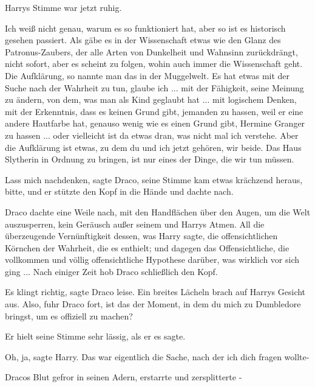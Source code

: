 Harrys Stimme war jetzt ruhig.

\glqq{}Ich weiß nicht genau, warum es so funktioniert hat, aber so ist es
historisch gesehen passiert. Als gäbe es in der Wissenschaft etwas wie den Glanz
des Patronus-Zaubers, der alle Arten von Dunkelheit und Wahnsinn zurückdrängt,
nicht sofort, aber es scheint zu folgen, wohin auch immer die Wissenschaft geht.
Die Aufklärung, so nannte man das in der Muggelwelt. Es hat etwas mit der Suche
nach der Wahrheit zu tun, glaube ich ... mit der Fähigkeit, seine Meinung zu
ändern, von dem, was man als Kind geglaubt hat ... mit logischem Denken, mit der
Erkenntnis, dass es keinen Grund gibt, jemanden zu hassen, weil er eine andere
Hautfarbe hat, genauso wenig wie es einen Grund gibt, Hermine Granger zu
hassen ... oder vielleicht ist da etwas dran, was nicht mal ich verstehe. Aber
die Aufklärung ist etwas, zu dem du und ich jetzt gehören, wir beide. Das Haus
Slytherin in Ordnung zu bringen, ist nur eines der Dinge, die wir tun
müssen.\grqq{}

\glqq{}Lass mich nachdenken\grqq{}, sagte Draco, seine Stimme kam etwas krächzend
heraus, \glqq{}bitte\grqq{}, und er stützte den Kopf in die Hände und dachte
nach.

Draco dachte eine Weile nach, mit den Handflächen über den Augen, um die Welt
auszusperren, kein Geräusch außer seinem und Harrys Atmen. All die überzeugende
Vernünftigkeit dessen, was Harry sagte, die offensichtlichen Körnchen der
Wahrheit, die es enthielt; und dagegen das Offensichtliche, die vollkommen und
völlig offensichtliche Hypothese darüber, was wirklich vor sich ging ... Nach
einiger Zeit hob Draco schließlich den Kopf.

\glqq{}Es klingt richtig\grqq{}, sagte Draco leise. Ein breites Lächeln brach auf
Harrys Gesicht aus. \glqq{}Also\grqq{}, fuhr Draco fort, \glqq{}ist das der
Moment, in dem du mich zu Dumbledore bringst, um es offiziell zu machen?\grqq{}

Er hielt seine Stimme sehr lässig, als er es sagte.

\glqq{}Oh, ja\grqq{}, sagte Harry. \glqq{}Das war eigentlich die Sache, nach der
ich dich fragen wollte-\grqq{}

Dracos Blut gefror in seinen Adern, erstarrte und zersplitterte -


